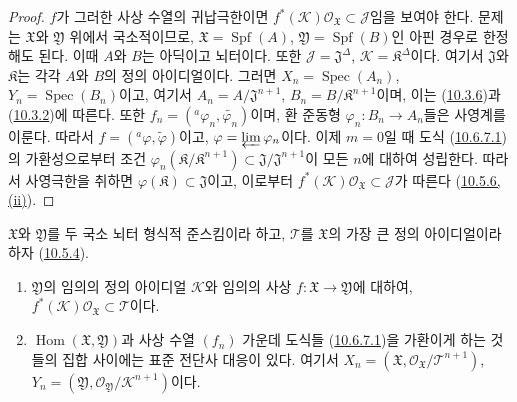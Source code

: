 \begin{proof}
$f$가 그러한 사상 수열의 귀납극한이면
$f^*(\mathscr{K})\mathscr{O}_{\mathfrak{X}}\subset\mathscr{J}$임을
보여야 한다. 문제는 $\mathfrak{X}$와 $\mathfrak{Y}$ 위에서
국소적이므로, $\mathfrak{X}=\operatorname{Spf}(A)$,
$\mathfrak{Y}=\operatorname{Spf}(B)$인 아핀 경우로 한정해도 된다.
이때 $A$와 $B$는 아딕이고 뇌터이다. 또한
$\mathscr{J}=\mathfrak{J}^\Delta$,
$\mathscr{K}=\mathfrak{K}^\Delta$이다. 여기서 $\mathfrak{J}$와
$\mathfrak{K}$는 각각 $A$와 $B$의 정의 아이디얼이다. 그러면
$X_n=\operatorname{Spec}(A_n)$,
$Y_n=\operatorname{Spec}(B_n)$이고, 여기서
$A_n=A/\mathfrak{J}^{n+1}$,
$B_n=B/\mathfrak{K}^{n+1}$이며, 이는
(\hyperref[I.10.3.6-ko]{10.3.6})과
(\hyperref[I.10.3.2-ko]{10.3.2})에 따른다. 또한
$f_n=({}^a\varphi_n,\widetilde{\varphi_n})$이며, 환 준동형
$\varphi_n:B_n\to A_n$들은 사영계를 이룬다. 따라서
$f=({}^a\varphi,\widetilde{\varphi})$이고,
$\varphi=\varprojlim\varphi_n$이다. 이제 $m=0$일 때 도식
(\hyperref[I.10.6.7.1-ko]{10.6.7.1})의 가환성으로부터 조건
$\varphi_n(\mathfrak{K}/\mathfrak{K}^{n+1})
\subset\mathfrak{J}/\mathfrak{J}^{n+1}$이 모든 $n$에 대하여
성립한다. 따라서 사영극한을 취하면
$\varphi(\mathfrak{K})\subset
\mathfrak{J}$이고, 이로부터
$f^*(\mathscr{K})\mathscr{O}_{\mathfrak{X}}\subset\mathscr{J}$가
따른다
(\hyperref[I.10.5.6-ko]{10.5.6, (ii)}).
\end{proof}

\begin{corollary}[10.6.10]
\label{I.10.6.10-ko}
$\mathfrak{X}$와 $\mathfrak{Y}$를 두 국소 뇌터 형식적 준스킴이라 하고,
$\mathscr{T}$를 $\mathfrak{X}$의 가장 큰 정의 아이디얼이라 하자
(\hyperref[I.10.5.4-ko]{10.5.4}).
\begin{enumerate}
  \item[{\upshape(i)}] $\mathfrak{Y}$의 임의의 정의 아이디얼
    $\mathscr{K}$와 임의의 사상
    $f:\mathfrak{X}\to\mathfrak{Y}$에 대하여,
    $f^*(\mathscr{K})\mathscr{O}_{\mathfrak{X}}\subset\mathscr{T}$이다.
  \item[{\upshape(ii)}]
    $\operatorname{Hom}(\mathfrak{X},\mathfrak{Y})$과 사상 수열
    $(f_n)$ 가운데 도식들
    (\hyperref[I.10.6.7.1-ko]{10.6.7.1})을 가환이게 하는 것들의 집합
    사이에는 표준 전단사 대응이 있다. 여기서
    $X_n=(\mathfrak{X},
    \mathscr{O}_{\mathfrak{X}}/\mathscr{T}^{n+1})$,
    $Y_n=(\mathfrak{Y},
    \mathscr{O}_{\mathfrak{Y}}/\mathscr{K}^{n+1})$이다.
\end{enumerate}
\end{corollary}


